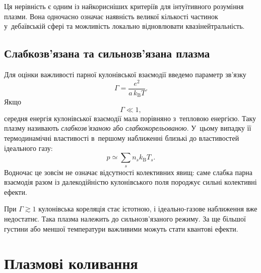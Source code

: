 Ця нерівність є одним із найкорисніших критеріїв для інтуїтивного розуміння плазми. Вона одночасно означає наявність великої кількості частинок у~дебаївській сфері та можливість локально відновлювати квазінейтральність.



\subsection{Слабкозв'язана та сильнозв'язана плазма}



Для оцінки важливості парної кулонівської взаємодії введемо параметр зв'язку
\begin{equation}
	\Gamma=
	\frac{e^2}{a\,k_{\mathrm B}T}.
\end{equation}
Якщо
\begin{equation}
	\Gamma\ll1,
\end{equation}
середня енергія кулонівської взаємодії мала порівняно з~тепловою енергією. Таку плазму називають \emph{слабкозв'язаною} або \emph{слабкокорельованою}. У~цьому випадку її термодинамічні властивості в~першому наближенні близькі до властивостей ідеального газу:
\begin{equation}
	p\simeq \sum_s n_s k_{\mathrm B}T_s.
\end{equation}
Водночас це зовсім не означає відсутності колективних явищ: саме слабка парна взаємодія разом із далекодійністю кулонівського поля породжує сильні колективні ефекти.

При $\Gamma\gtrsim1$ кулонівська кореляція стає істотною, і ідеально-газове наближення вже недостатнє. Така плазма належить до сильнозв'язаного режиму. За ще більшої густини або меншої температури важливими можуть стати квантові ефекти.



\section{Плазмові коливання}



